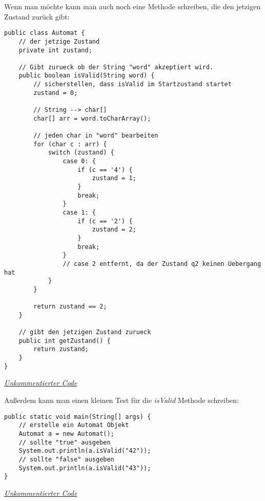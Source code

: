 \begin{flushleft}
    Wenn man möchte kann man auch noch eine Methode schreiben, die den jetzigen Zustand zurück gibt:
\end{flushleft}

\begin{center}
\begin{lstlisting}
public class Automat {
    // der jetzige Zustand
    private int zustand;

    // Gibt zurueck ob der String "word" akzeptiert wird.
    public boolean isValid(String word) {
        // sicherstellen, dass isValid im Startzustand startet
        zustand = 0;

        // String --> char[]
        char[] arr = word.toCharArray();

        // jeden char in "word" bearbeiten
        for (char c : arr) {
            switch (zustand) {
                case 0: {
                    if (c == '4') {
                        zustand = 1;
                    }
                    break;
                }
                case 1: {
                    if (c == '2') {
                        zustand = 2;
                    }
                    break;
                }
                // case 2 entfernt, da der Zustand q2 keinen Uebergang hat
            }
        }

        return zustand == 2;
    }

    // gibt den jetzigen Zustand zurueck
    public int getZustand() {
        return zustand;
    }
}
\end{lstlisting}
\href{https://raw.githubusercontent.com/tim-tm/articles/refs/heads/main/informatik-notes/code/Automat.java}{\textit{Unkommentierter Code}} \\
\end{center}

\begin{flushleft}
    Außerdem kann man einen kleinen Test für die \textit{isValid} Methode schreiben:
\end{flushleft}

\begin{center}
\begin{lstlisting}
public static void main(String[] args) {
    // erstelle ein Automat Objekt
    Automat a = new Automat();
    // sollte "true" ausgeben
    System.out.println(a.isValid("42"));
    // sollte "false" ausgeben
    System.out.println(a.isValid("43"));
}
\end{lstlisting}
\href{https://raw.githubusercontent.com/tim-tm/articles/refs/heads/main/informatik-notes/code/Automat.java}{\textit{Unkommentierter Code}} \\
\end{center}
